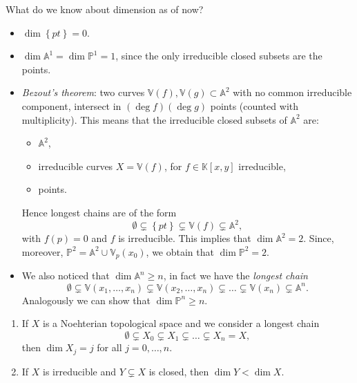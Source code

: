 \begin{rem}
	What do we know about dimension as of now?
	\begin{itemize}
		\item $\dim \left\{ pt \right\} = 0$.
		\item $\dim \mathbb{A}^{1} = \dim \mathbb{P}^{1} = 1$, since the only irreducible closed subsets are the points.
		\item \textit{Bezout's theorem}: two curves $\mathbb{V}\left( f \right), \mathbb{V}\left( g \right) \subset \mathbb{A}^{2}$ with no common irreducible component, 
			intersect in $\left( \deg f \right) \left( \deg g \right)$ points (counted with multiplicity).
			This means that the irreducible closed subsets of $\mathbb{A}^{2}$ are:
			\begin{itemize}
				\item $\mathbb{A}^{2}$,
				\item irreducible curves $X = \mathbb{V}\left( f \right)$, for $f \in \mathbb{K}\left[x, y \right]$ irreducible,
				\item points.
			\end{itemize}
			Hence longest chains are of the form
			\begin{equation}
			\emptyset \subsetneq \left\{ pt \right\} \subsetneq \mathbb{V}\left( f \right) \subsetneq \mathbb{A}^{2}
			,\end{equation} 
			with $f(p) = 0$ and $f$ is irreducible.
			This implies that $\dim \mathbb{A}^{2} = 2$.
			Since, moreover, $\mathbb{P}^{2} = \mathbb{A}^{2} \cup \mathbb{V}_p\left( x_0 \right)$, we obtain that $\dim \mathbb{P}^{2} = 2$.
		\item We also noticed that $\dim \mathbb{A}^{n} \geq n$, in fact we have the \textit{longest chain}
			\begin{equation}
			\emptyset \subsetneq \mathbb{V}\left( x_1, \ldots, x_n \right) \subsetneq
			\mathbb{V}\left( x_2, \ldots, x_n \right) \subsetneq \ldots \subsetneq
			\mathbb{V}\left( x_n \right) \subsetneq \mathbb{A}^{n}
			.\end{equation} 
			Analogously we can show that $\dim \mathbb{P}^{n} \geq n$.
	\end{itemize}
\end{rem}

\begin{lem}\leavevmode\vspace{-.2\baselineskip}
	\begin{enumerate}
		\item If $X$ is a Noehterian topological space and we consider a longest chain
			\begin{equation}
			\emptyset \subsetneq X_0 \subsetneq X_1
			\subsetneq \ldots \subsetneq X_n = X
			,\end{equation} 
			then $\dim X_j = j$ for all $j = 0, \ldots, n$.
		\item If $X$ is irreducible and $Y \subsetneq X$ is closed, then $\dim Y < \dim X$.
	\end{enumerate}
\end{lem} 

